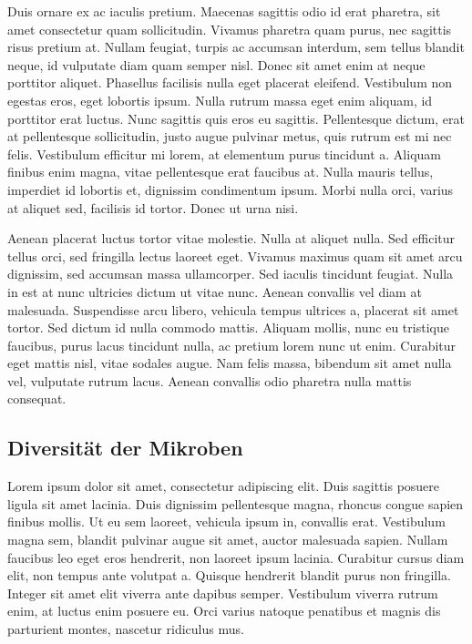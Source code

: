 \documentclass[
  ngerman,
  14pt,
  a4paper,
  DIV=11,
  twoside]{scrreprt}
\begin{document}
Duis ornare ex ac iaculis pretium. Maecenas sagittis odio id erat
pharetra, sit amet consectetur quam sollicitudin. Vivamus pharetra quam
purus, nec sagittis risus pretium at. Nullam feugiat, turpis ac accumsan
interdum, sem tellus blandit neque, id vulputate diam quam semper nisl.
Donec sit amet enim at neque porttitor aliquet. Phasellus facilisis
nulla eget placerat eleifend. Vestibulum non egestas eros, eget lobortis
ipsum. Nulla rutrum massa eget enim aliquam, id porttitor erat luctus.
Nunc sagittis quis eros eu sagittis. Pellentesque dictum, erat at
pellentesque sollicitudin, justo augue pulvinar metus, quis rutrum est
mi nec felis. Vestibulum efficitur mi lorem, at elementum purus
tincidunt a. Aliquam finibus enim magna, vitae pellentesque erat
faucibus at. Nulla mauris tellus, imperdiet id lobortis et, dignissim
condimentum ipsum. Morbi nulla orci, varius at aliquet sed, facilisis id
tortor. Donec ut urna nisi.

Aenean placerat luctus tortor vitae molestie. Nulla at aliquet nulla.
Sed efficitur tellus orci, sed fringilla lectus laoreet eget. Vivamus
maximus quam sit amet arcu dignissim, sed accumsan massa ullamcorper.
Sed iaculis tincidunt feugiat. Nulla in est at nunc ultricies dictum ut
vitae nunc. Aenean convallis vel diam at malesuada. Suspendisse arcu
libero, vehicula tempus ultrices a, placerat sit amet tortor. Sed dictum
id nulla commodo mattis. Aliquam mollis, nunc eu tristique faucibus,
purus lacus tincidunt nulla, ac pretium lorem nunc ut enim. Curabitur
eget mattis nisl, vitae sodales augue. Nam felis massa, bibendum sit
amet nulla vel, vulputate rutrum lacus. Aenean convallis odio pharetra
nulla mattis consequat.

\subsection{Diversität der Mikroben}\label{diversituxe4t-der-mikroben}

Lorem ipsum dolor sit amet, consectetur adipiscing elit. Duis sagittis
posuere ligula sit amet lacinia. Duis dignissim pellentesque magna,
rhoncus congue sapien finibus mollis. Ut eu sem laoreet, vehicula ipsum
in, convallis erat. Vestibulum magna sem, blandit pulvinar augue sit
amet, auctor malesuada sapien. Nullam faucibus leo eget eros hendrerit,
non laoreet ipsum lacinia. Curabitur cursus diam elit, non tempus ante
volutpat a. Quisque hendrerit blandit purus non fringilla. Integer sit
amet elit viverra ante dapibus semper. Vestibulum viverra rutrum enim,
at luctus enim posuere eu. Orci varius natoque penatibus et magnis dis
parturient montes, nascetur ridiculus mus.
\end{document}
